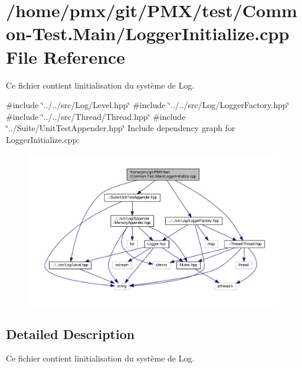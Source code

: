 \hypertarget{test_2Common-Test_8Main_2LoggerInitialize_8cpp}{}\section{/home/pmx/git/\+P\+M\+X/test/\+Common-\/\+Test.Main/\+Logger\+Initialize.cpp File Reference}
\label{test_2Common-Test_8Main_2LoggerInitialize_8cpp}


Ce fichier contient l\textquotesingle{}initialisation du système de Log.  


{\ttfamily \#include \char`\"{}../../src/\+Log/\+Level.\+hpp\char`\"{}}\newline
{\ttfamily \#include \char`\"{}../../src/\+Log/\+Logger\+Factory.\+hpp\char`\"{}}\newline
{\ttfamily \#include \char`\"{}../../src/\+Thread/\+Thread.\+hpp\char`\"{}}\newline
{\ttfamily \#include \char`\"{}../\+Suite/\+Unit\+Test\+Appender.\+hpp\char`\"{}}\newline
Include dependency graph for Logger\+Initialize.\+cpp\+:
\nopagebreak
\begin{figure}[H]
\begin{center}
\leavevmode
\includegraphics[width=350pt]{test_2Common-Test_8Main_2LoggerInitialize_8cpp__incl}
\end{center}
\end{figure}


\subsection{Detailed Description}
Ce fichier contient l\textquotesingle{}initialisation du système de Log. 

